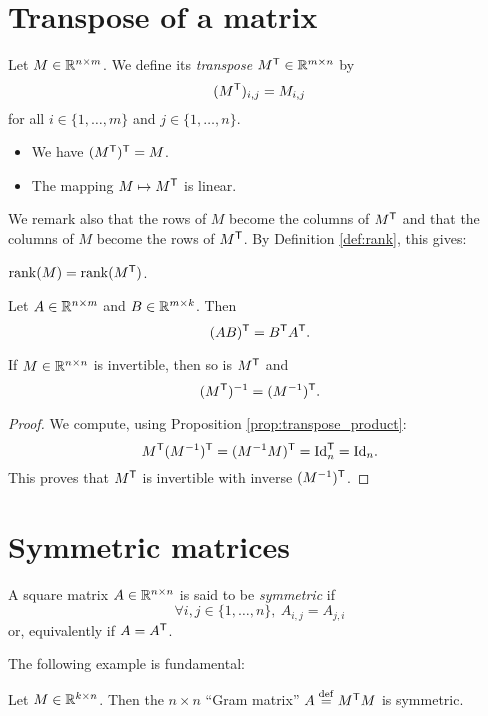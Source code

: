 \documentclass[11pt,nocut]{article}
\begin{document}
\section{Transpose of a matrix}

\begin{definition}[Transpose]
	Let $M \in \mathbb{R}^{n \times m}$. We define its \emph{transpose} $M^{{\sf T}} \in \mathbb{R}^{m \times n}$ by
	$$
	(M^{{\sf T}})_{i,j} = M_{i,j}
	$$
	for all $i \in \{1, \dots, m\}$ and $j \in \{1, \dots, n\}$.
\end{definition}

\begin{remark}
	\leavevmode
	\begin{itemize}
		\item We have $(M^{{\sf T}})^{{\sf T}} = M$. 
		\item The mapping $M \mapsto M^{{\sf T}}$ is linear.
	\end{itemize}
\end{remark}

We remark also that the rows of $M$ become the columns of $M^{{\sf T}}$ and that the columns of $M$ become the rows of $M^{{\sf T}}$. By Definition \ref{def:rank}, this gives:
\begin{proposition}
	${{\rm rank}}(M) = {{\rm rank}}(M^{{\sf T}})$.
\end{proposition}

\begin{proposition}\label{prop:transpose_product}
	Let $A \in \mathbb{R}^{n \times m}$ and $B \in \mathbb{R}^{m \times k}$. Then
	$$
	(AB)^{{\sf T}} = B^{{\sf T}} A^{{\sf T}}.
	$$
\end{proposition}

\begin{corollary}
	If $M \in \mathbb{R}^{n \times n}$ is invertible, then so is $M^{{\sf T}}$ and
	$$
	(M^{{\sf T}})^{-1} = (M^{-1})^{{\sf T}}.
	$$
\end{corollary}
\begin{proof}
	We compute, using Proposition \ref{prop:transpose_product}:
	$$
	M^{{\sf T}} (M^{-1})^{{\sf T}} = (M^{-1} M)^{{\sf T}} = {{\rm Id}}_n^{{\sf T}} = {{\rm Id}}_n.
	$$
	This proves that $M^{{\sf T}}$ is invertible with inverse $(M^{-1})^{{\sf T}}$.
\end{proof}

\section{Symmetric matrices}

\begin{definition}
	A square matrix $A \in \mathbb{R}^{n \times n}$ is said to be \emph{symmetric} if
	$$
	\forall i,j \in \{1, \dots, n\}, \ A_{i,j} = A_{j,i}
	$$
	or, equivalently if $A = A^{{\sf T}}$.
\end{definition}

The following example is fundamental:
\begin{example}
	Let $M \in \mathbb{R}^{k \times n}$. Then the $n\times n$ ``Gram matrix'' $A \overset{\rm def}{=} M^{{\sf T}} M$ is symmetric.
\end{example}

	\vspace{1cm}
	\centerline{}

%
%
\end{document}
